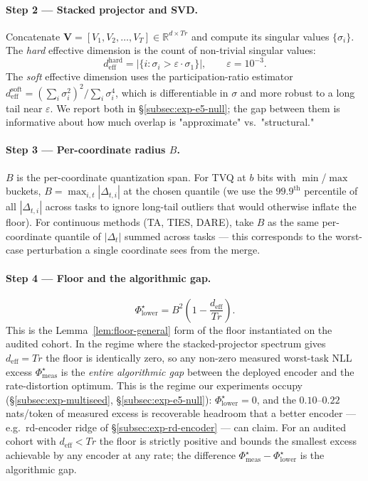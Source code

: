 \paragraph{Step 2 --- Stacked projector and SVD.}
Concatenate $\mathbf{V} = [V_1, V_2, \dots, V_T] \in
\mathbb{R}^{d \times Tr}$ and compute its singular values
$\{\sigma_i\}$. The \emph{hard} effective dimension is the count of
non-trivial singular values:
\begin{equation*}
  d_{\mathrm{eff}}^{\mathrm{hard}}
  = \big| \{i : \sigma_i > \varepsilon \cdot \sigma_1\} \big|,
  \qquad \varepsilon = 10^{-3}.
\end{equation*}
The \emph{soft} effective dimension uses the participation-ratio
estimator $d_{\mathrm{eff}}^{\mathrm{soft}} = (\sum_i \sigma_i^2)^2 /
\sum_i \sigma_i^4$, which is differentiable in $\sigma$ and more
robust to a long tail near $\varepsilon$. We report both in
\S\ref{subsec:exp-e5-null}; the gap between them is informative
about how much overlap is "approximate" vs.\ "structural."

\paragraph{Step 3 --- Per-coordinate radius $B$.}
$B$ is the per-coordinate quantization span. For TVQ at $b$ bits with
$\min$/$\max$ buckets, $B = \max_{i, t} |\Delta_{t,i}|$ at the chosen
quantile (we use the $99.9^{\mathrm{th}}$ percentile of all
$|\Delta_{t,i}|$ across tasks to ignore long-tail outliers that would
otherwise inflate the floor). For continuous methods (TA, TIES, DARE),
take $B$ as the same per-coordinate quantile of $|\Delta_t|$ summed
across tasks --- this corresponds to the worst-case perturbation a
single coordinate sees from the merge.

\paragraph{Step 4 --- Floor and the algorithmic gap.}
\begin{equation*}
  \Phi^\star_{\mathrm{lower}}
  = B^2 \left(1 - \frac{d_{\mathrm{eff}}}{T r}\right).
\end{equation*}
This is the Lemma~\ref{lem:floor-general} form of the floor instantiated
on the audited cohort. In the regime where the stacked-projector
spectrum gives $d_{\mathrm{eff}} = Tr$ the floor is identically zero,
so any non-zero measured worst-task NLL excess
$\Phi^\star_{\mathrm{meas}}$ is the \emph{entire algorithmic gap}
between the deployed encoder and the rate-distortion optimum. This is
the regime our experiments occupy
(\S\ref{subsec:exp-multiseed}, \S\ref{subsec:exp-e5-null}):
$\Phi^\star_{\mathrm{lower}} = 0$, and the $0.10$--$0.22$ nats/token
of measured excess is recoverable headroom that a better encoder ---
e.g.\ rd-encoder ridge of \S\ref{subsec:exp-rd-encoder} --- can claim.
For an audited cohort with $d_{\mathrm{eff}} < Tr$ the floor is
strictly positive and bounds the smallest excess achievable by any
encoder at any rate; the difference
$\Phi^\star_{\mathrm{meas}} - \Phi^\star_{\mathrm{lower}}$ is the
algorithmic gap.

